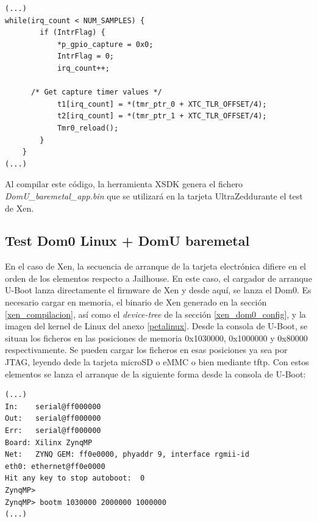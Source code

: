 \begin{lstlisting}[style=CStyle]
(...)
while(irq_count < NUM_SAMPLES) {
		if (IntrFlag) {
			*p_gpio_capture = 0x0;
			IntrFlag = 0;
			irq_count++;

      /* Get capture timer values */
			t1[irq_count] = *(tmr_ptr_0 + XTC_TLR_OFFSET/4);
			t2[irq_count] = *(tmr_ptr_1 + XTC_TLR_OFFSET/4);
			Tmr0_reload();
		}
	}
(...)
\end{lstlisting}

Al compilar este código, la herramienta \acrshort{XSDK} genera el fichero \textit{DomU\_baremetal\_app.bin} que se utilizará en la tarjeta UltraZed\texttrademark durante el test de Xen.

\subsection{Test Dom0 Linux + DomU baremetal} \label{section:text_xen}

En el caso de Xen, la secuencia de arranque de la tarjeta electrónica difiere en el orden de los elementos respecto a Jailhouse. En este caso, el cargador de arranque U-Boot lanza directamente el firmware de Xen y desde aquí, se lanza el Dom0. Es necesario cargar en memoria, el binario de Xen generado en la sección \ref{xen_compilacion}, así como el \textit{device-tree} de la sección \ref{xen_dom0_config}, y la imagen del kernel de Linux del anexo \ref{petalinux}. Desde la consola de U-Boot, se situan los ficheros en las posiciones de memoria 0x1030000, 0x1000000 y 0x80000 respectivamente. Se pueden cargar los ficheros en esas posiciones ya sea por \acrshort{JTAG}, leyendo dede la tarjeta microSD o \acrshort{eMMC} o bien mediante tftp.
Con estos elementos se lanza el arranque de la siguiente forma desde la consola de U-Boot:

\begin{lstlisting}[style=CStyle]
(...)
In:    serial@ff000000
Out:   serial@ff000000
Err:   serial@ff000000
Board: Xilinx ZynqMP
Net:   ZYNQ GEM: ff0e0000, phyaddr 9, interface rgmii-id
eth0: ethernet@ff0e0000
Hit any key to stop autoboot:  0
ZynqMP>
ZynqMP> bootm 1030000 2000000 1000000
(...)
\end{lstlisting}

